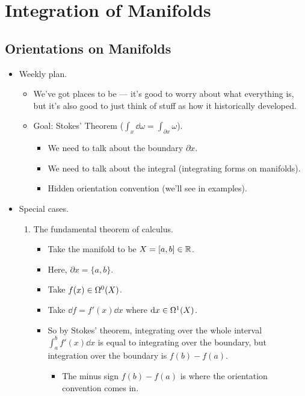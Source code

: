 \documentclass[../notes.tex]{subfiles}
\begin{document}
\chapter{Integration of Manifolds}
\section{Orientations on Manifolds}
\begin{itemize}
    \item {}Weekly plan.
    \begin{itemize}
        \item We've got places to be --- it's good to worry about what everything is, but it's also good to just think of stuff as how it historically developed.
        \item Goal: Stokes' Theorem ($\int_x\dd{\omega}=\int_{\partial x}\omega$).
        \begin{itemize}
            \item We need to talk about the boundary $\partial x$.
            \item We need to talk about the integral (integrating forms on manifolds).
            \item Hidden orientation convention (we'll see in examples).
        \end{itemize}
    \end{itemize}
    \item Special cases.
    \begin{enumerate}
        \item The fundamental theorem of calculus.
        \begin{itemize}
            \item Take the manifold to be $X=[a,b]\in\R$.
            \item Here, $\partial x=\{a,b\}$.
            \item Take $f(x)\in\ome[0]{X}$.
            \item Take $\dd{f}=f'(x)\dd{x}$ where $\dd{x}\in\ome[1]{X}$.
            \item So by Stokes' theorem, integrating over the whole interval $\int_a^bf'(x)\dd{x}$ is equal to integrating over the boundary, but integration over the boundary is $f(b)-f(a)$.
            \begin{itemize}
                \item The minus sign $f(b)-f(a)$ is where the orientation convention comes in.
            \end{itemize}

\end{itemize}
\end{enumerate}
\end{itemize}
\end{document}

